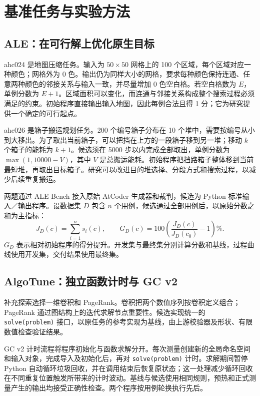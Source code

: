 \section{基准任务与实验方法}
\label{sec:protocol}
\subsection{ALE：在可行解上优化原生目标}
ahc024 是地图压缩任务。输入为 $50\times50$ 网格上的 100 个区域，每个区域对应一种颜色；网格外为 0 色。输出仍为同样大小的网格，要求每种颜色保持连通、任意两种颜色的邻接关系与输入一致，并尽量增加 0 色空白格。若空白格数为 $E$，单例分数为 $E+1$。区域面积可以变化，而连通与邻接关系构成整个搜索过程必须满足的约束。初始程序直接输出输入地图，因此每例合法且得 1 分；它为研究提供一个确定的可行起点。

ahc026 是箱子搬运规划任务。200 个编号箱子分布在 10 个堆中，需要按编号从小到大移出。为了取出当前箱子，可以把挡在上方的一段箱子移到另一堆；移动 $k$ 个箱子的能耗为 $k+1$。候选须在 5000 步以内完成全部取出，单例分数为 $\max(1,10000-V)$，其中 $V$ 是总搬运能耗。初始程序把挡路箱子整体移到当前最短堆，再取出目标箱子。研究可以改进目的堆选择、分段方式和搜索过程，以减少后续重复搬运。

两题通过 ALE-Bench 接入原始 AtCoder 生成器和裁判，候选为 Python 标准输入／输出程序。设数据集 $D$ 包含 $n$ 个用例，候选通过全部用例后，以原始分数之和为主指标：
\begin{equation}
 J_D(c)=\sum_{i=1}^{n}s_i(c),\qquad
 G_D(c)=100\left(\frac{J_D(c)}{J_D(c_0)}-1\right)\% .
\end{equation}
$G_D$ 表示相对初始程序的得分提升。开发集与最终集分别计算分数和基线，过程曲线使用开发集，交付结果使用最终集。

\subsection{AlgoTune：独立函数计时与 GC v2}
补充探索选择一维卷积和 PageRank。卷积把两个数值序列按卷积定义组合；PageRank 通过图结构上的迭代求解节点重要性。候选实现统一的 \texttt{solve(problem)} 接口，以原任务的参考实现为基线，由上游校验器及形状、有限数值检查验证结果。

GC v2 计时流程将程序初始化与函数求解分开。每次测量创建新的全局命名空间和输入对象，完成导入及初始化后，再对 \texttt{solve(problem)} 计时。求解期间暂停 Python 自动循环垃圾回收，并在调用结束后恢复原状态；这一处理减少循环回收在不同重复位置触发所带来的计时波动。基线与候选使用相同规则，预热和正式测量产生的输出均接受正确性检查。两个程序按用例轮换执行先后。

